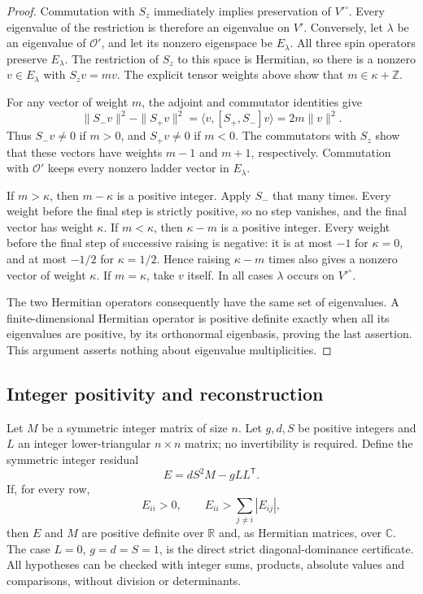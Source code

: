 \begin{proof}
Commutation with \(S_z\) immediately implies preservation of
\(V'^\circ\).  Every eigenvalue of the restriction is therefore
an eigenvalue on \(V'\).  Conversely, let \(\lambda\) be an
eigenvalue of \(\mathcal O'\), and let its nonzero eigenspace
be \(E_\lambda\).  All three spin operators preserve
\(E_\lambda\).  The restriction of \(S_z\) to this space is
Hermitian, so there is a nonzero \(v\in E_\lambda\) with
\(S_zv=mv\).  The explicit tensor weights above show that
\(m\in\kappa+\mathbb Z\).

For any vector of weight \(m\), the adjoint and commutator
identities give
\[
 \|S_-v\|^2-\|S_+v\|^2
       =\langle v,[S_+,S_-]v\rangle=2m\|v\|^2.
\]
Thus \(S_-v\ne0\) if \(m>0\), and \(S_+v\ne0\) if \(m<0\).
The commutators with \(S_z\) show that these vectors have weights
\(m-1\) and \(m+1\), respectively.  Commutation with
\(\mathcal O'\) keeps every nonzero ladder vector in
\(E_\lambda\).

If \(m>\kappa\), then \(m-\kappa\) is a positive integer.
Apply \(S_-\) that many times.  Every weight before the final
step is strictly positive, so no step vanishes, and the final
vector has weight \(\kappa\).  If \(m<\kappa\), then
\(\kappa-m\) is a positive integer.  Every weight before the
final step of successive raising is negative: it is at most
\(-1\) for \(\kappa=0\), and at most \(-1/2\) for
\(\kappa=1/2\).  Hence raising \(\kappa-m\) times also gives a
nonzero vector of weight \(\kappa\).  If \(m=\kappa\), take
\(v\) itself.  In all cases \(\lambda\) occurs on
\(V'^\circ\).

The two Hermitian operators consequently have the same set of
eigenvalues.  A finite-dimensional Hermitian operator is
positive definite exactly when all its eigenvalues are positive,
by its orthonormal eigenbasis, proving the last assertion.
This argument asserts nothing about eigenvalue multiplicities.
\end{proof}

\subsection{Integer positivity and reconstruction}

\begin{lemma}\label{l:gram-residual}
Let \(M\) be a symmetric integer matrix of size \(n\).
Let \(g,d,S\) be positive integers and \(L\) an integer
lower-triangular \(n\times n\) matrix; no invertibility is required.
Define the symmetric integer residual
\[
 E=dS^2M-gLL^{\mathsf T}.
\]
If, for every row,
\[
 E_{ii}>0,\qquad E_{ii}>\sum_{j\ne i}|E_{ij}|,
\]
then \(E\) and \(M\) are positive definite over \(\mathbb R\)
and, as Hermitian matrices, over \(\mathbb C\).
The case \(L=0\), \(g=d=S=1\), is the direct strict
diagonal-dominance certificate.
All hypotheses can be checked with integer sums, products,
absolute values and comparisons, without division or determinants.
\end{lemma}

